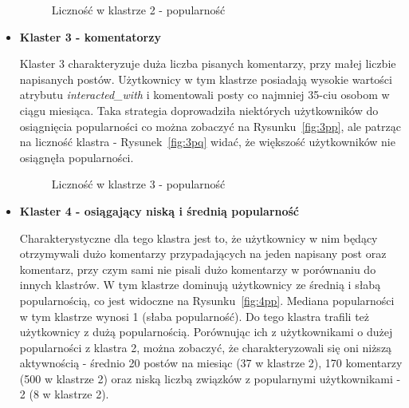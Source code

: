 \documentclass[polish,12pt]{aghthesis}
\begin{document}
\begin{itemize}
   \begin{figure}[ht] 
    \centering
    \hfill%
    \caption{Liczność w klastrze 2 - popularność}
    \label{f:2p}
    \end{figure}

    

    \item \textbf{Klaster 3 - komentatorzy}
    
Klaster 3 charakteryzuje duża liczba pisanych komentarzy, przy małej liczbie napisanych postów. Użytkownicy w tym klastrze posiadają wysokie wartości atrybutu \textit{interacted\_with} i komentowali posty co najmniej 35-ciu osobom w ciągu miesiąca. Taka strategia doprowadziła niektórych użytkowników do osiągnięcia popularności co można zobaczyć na Rysunku~\ref{fig:3pp}, ale patrząc na liczność klastra - Rysunek~\ref{fig:3pq} widać, że większość użytkowników nie osiągnęła popularności.

   \begin{figure}[ht] 
    \centering
    \hfill%
    \caption{Liczność w klastrze 3 - popularność}
    \label{f:3p}
    \end{figure}
    
    
    \item \textbf{Klaster 4 - osiągający niską i średnią popularność}
    
Charakterystyczne dla tego klastra jest to, że użytkownicy w nim będący otrzymywali dużo komentarzy przypadających na jeden napisany post oraz komentarz, przy czym sami nie pisali dużo komentarzy w porównaniu do innych klastrów. W tym klastrze dominują użytkownicy ze średnią i słabą popularnością, co jest widoczne na Rysunku~\ref{fig:4pp}. Mediana popularności w tym klastrze wynosi 1 (słaba popularność). Do tego klastra trafili też użytkownicy z dużą popularnością. Porównując ich z użytkownikami o dużej popularności z klastra 2, można zobaczyć, że charakteryzowali się oni niższą aktywnością - średnio 20 postów na miesiąc (37 w klastrze 2), 170 komentarzy (500 w klastrze 2) oraz niską liczbą związków z popularnymi użytkownikami - 2 (8 w klastrze 2).


\end{itemize}
\end{document}
